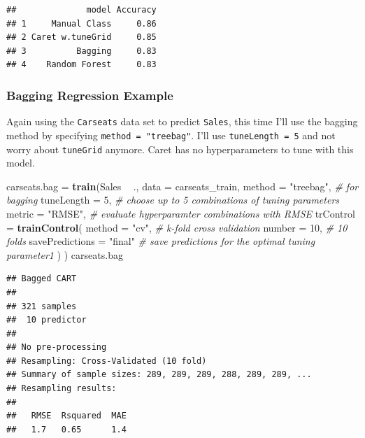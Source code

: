 \documentclass[
]{book}
\newenvironment{Shaded}{\begin{snugshade}}{\end{snugshade}}
\newcommand{\CommentTok}[1]{\textcolor[rgb]{0.56,0.35,0.01}{\textit{#1}}}
\newcommand{\DataTypeTok}[1]{\textcolor[rgb]{0.13,0.29,0.53}{#1}}
\newcommand{\DecValTok}[1]{\textcolor[rgb]{0.00,0.00,0.81}{#1}}
\newcommand{\KeywordTok}[1]{\textcolor[rgb]{0.13,0.29,0.53}{\textbf{#1}}}
\newcommand{\NormalTok}[1]{#1}
\newcommand{\OperatorTok}[1]{\textcolor[rgb]{0.81,0.36,0.00}{\textbf{#1}}}
\newcommand{\StringTok}[1]{\textcolor[rgb]{0.31,0.60,0.02}{#1}}
\begin{document}
\begin{verbatim}
##              model Accuracy
## 1     Manual Class     0.86
## 2 Caret w.tuneGrid     0.85
## 3          Bagging     0.83
## 4    Random Forest     0.83
\end{verbatim}

\hypertarget{bagging-regression-example}{%
\subsubsection{Bagging Regression Example}\label{bagging-regression-example}}

Again using the \texttt{Carseats} data set to predict \texttt{Sales}, this time I'll use the bagging method by specifying \texttt{method\ =\ "treebag"}. I'll use \texttt{tuneLength\ =\ 5} and not worry about \texttt{tuneGrid} anymore. Caret has no hyperparameters to tune with this model.

\begin{Shaded}
\begin{Highlighting}[]
\NormalTok{carseats.bag =}\StringTok{ }\KeywordTok{train}\NormalTok{(Sales }\OperatorTok{~}\StringTok{ }\NormalTok{., }
               \DataTypeTok{data =}\NormalTok{ carseats_train, }
               \DataTypeTok{method =} \StringTok{"treebag"}\NormalTok{,  }\CommentTok{# for bagging}
               \DataTypeTok{tuneLength =} \DecValTok{5}\NormalTok{,  }\CommentTok{# choose up to 5 combinations of tuning parameters}
               \DataTypeTok{metric =} \StringTok{"RMSE"}\NormalTok{,  }\CommentTok{# evaluate hyperparamter combinations with RMSE}
               \DataTypeTok{trControl =} \KeywordTok{trainControl}\NormalTok{(}
                 \DataTypeTok{method =} \StringTok{"cv"}\NormalTok{,  }\CommentTok{# k-fold cross validation}
                 \DataTypeTok{number =} \DecValTok{10}\NormalTok{,  }\CommentTok{# 10 folds}
                 \DataTypeTok{savePredictions =} \StringTok{"final"}       \CommentTok{# save predictions for the optimal tuning parameter1}
\NormalTok{                 )}
\NormalTok{               )}
\NormalTok{carseats.bag}
\end{Highlighting}
\end{Shaded}

\begin{verbatim}
## Bagged CART 
## 
## 321 samples
##  10 predictor
## 
## No pre-processing
## Resampling: Cross-Validated (10 fold) 
## Summary of sample sizes: 289, 289, 289, 288, 289, 289, ... 
## Resampling results:
## 
##   RMSE  Rsquared  MAE
##   1.7   0.65      1.4
\end{verbatim}
\end{document}
